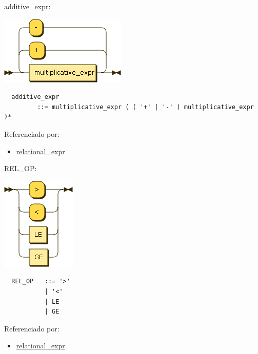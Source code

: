 \begin{minipage}{\textwidth}
  \protect\hypertarget{additive_expr}{}{additive\_expr:}

  \includegraphics[width=2.37500in,height=1.29167in]{diagram/additive_expr.png}

  \begin{verbatim}
  additive_expr
         ::= multiplicative_expr ( ( '+' | '-' ) multiplicative_expr )*
  \end{verbatim}

  Referenciado por:

  \begin{itemize}
      \tightlist%
    \item
      \protect\hyperlink{relational_expr}{relational\_expr}
  \end{itemize}

\end{minipage}

\begin{minipage}{\textwidth}
  \protect\hypertarget{REL_OP}{}{REL\_OP:}

  \includegraphics[width=1.39583in,height=1.75000in]{diagram/REL_OP.png}

  \begin{verbatim}
  REL_OP   ::= '>'
           | '<'
           | LE
           | GE
  \end{verbatim}

  Referenciado por:

  \begin{itemize}
      \tightlist%
    \item
      \protect\hyperlink{relational_expr}{relational\_expr}
  \end{itemize}

\end{minipage}

